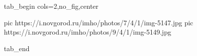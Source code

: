  
 
 
 
 


\ifcmt
  tab_begin cols=2,no_fig,center

     pic https://i.novgorod.ru/imho/photos/7/4/1/img-5147.jpg
		 pic https://i.novgorod.ru/imho/photos/9/4/1/img-5149.jpg

  tab_end
\fi
